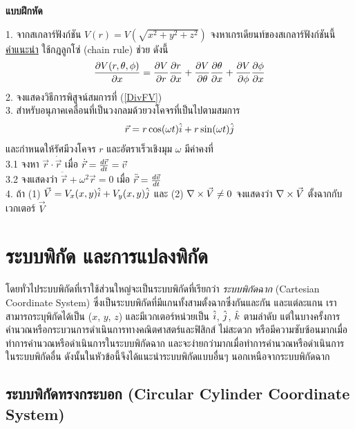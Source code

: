 \begin{center}
\Large{\textbf{แบบฝึกหัด}}\\
\end{center}
1. จากสเกลาร์ฟังก์ชัน $V(r) = V(\sqrt{x^2 + y^2 + z^2})$ จงหาเกรเดียนท์ของสเกลาร์ฟังก์ชันนี้ \\ \underline{คำแนะนำ} ใช้กฎลูกโซ่ (chain rule) ช่วย ดังนี้\\
\begin{equation}\label{ChainRuleSpherical}
\frac{\partial V(r, \theta, \phi)}{\partial x} = \frac{\partial V}{\partial r}\frac{\partial r}{\partial x} + \frac{\partial V}{\partial \theta}\frac{\partial \theta}{\partial x} + \frac{\partial V}{\partial \phi}\frac{\partial \phi}{\partial x} \nonumber
\end{equation}
2. จงแสดงวิธีการพิสูจน์สมการที่ (\ref{DivFV})\\
3. สำหรับอนุภาคเคลื่อนที่เป็นวงกลมด้วยวงโคจรที่เป็นไปตามสมการ
 \begin{equation}\label{excercise2.3}
 \vec{r} = r \cos(\omega t)\hat{i} + r \sin(\omega t)\hat{j} \nonumber
 \end{equation}
 และกำหนดให้รัศมีวงโคจร $r$ และอัตราเร็วเชิงมุม $\omega$ มีค่าคงที่\\
3.1 จงหา $\vec{r}\cdot\dot{\vec{r}}$ เมื่อ $\dot{\vec{r}} = \frac{d\vec{r}}{dt} = \vec{v}$ \\
3.2 จงแสดงว่า $\ddot{\vec{r}} + \omega^2\vec{r} = 0$ เมื่อ $\ddot{\vec{r}} = \frac{d\vec{v}}{dt}$\\
4. ถ้า (1) $\vec{V} = V_x(x, y)\hat{i} + V_y(x, y)\hat{j}$ และ (2) $\nabla\times\vec{V} \neq 0$ จงแสดงว่า $\nabla\times\vec{V}$ ตั้งฉากกับเวกเตอร์ $\vec{V}$\\

\section{ระบบพิกัด และการแปลงพิกัด}

โดยทั่วไประบบพิกัดที่เราใช้ส่วนใหญ่จะเป็นระบบพิกัดที่เรียกว่า \emph{ระบบพิกัดฉาก} (Cartesian Coordinate System) ซึ่งเป็นระบบพิกัดที่มีแกนทั้งสามตั้งฉากซึ่งกันและกัน และแต่ละแกน เราสามารถระบุพิกัดได้เป็น ($x$, $y$, $z$) และมีเวกเตอร์หน่วยเป็น $\hat{i}$, $\hat{j}$, $\hat{k}$ ตามลำดับ แต่ในบางครั้งการคำนวณหรือกระบวนการดำเนินการทางคณิตศาสตร์และฟิสิกส์ ไม่สะดวก หรือมีความซับซ้อนมากเมื่อทำการคำนวณหรือดำเนินการในระบบพิกัดฉาก และจะง่ายกว่ามากเมื่อทำการคำนวณหรือดำเนินการในระบบพิกัดอื่น ดังนั้นในหัวข้อนี้จึงได้แนะนำระบบพิกัดแบบอื่นๆ นอกเหนือจากระบบพิกัดฉาก

\subsection{ระบบพิกัดทรงกระบอก (Circular Cylinder Coordinate System)}

